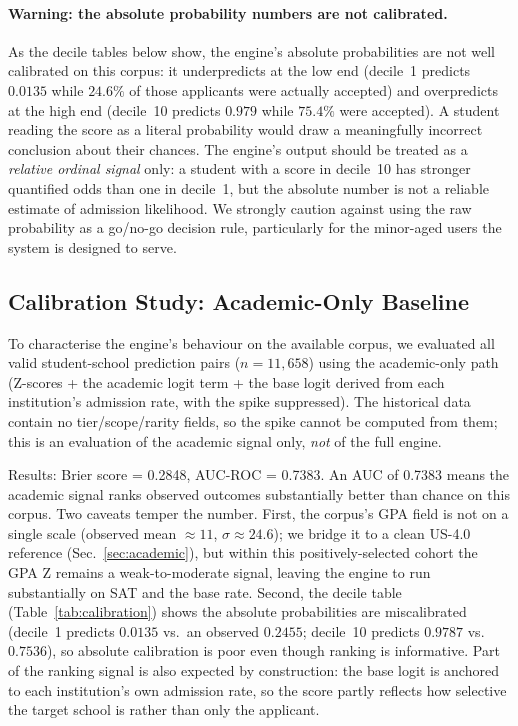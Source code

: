 \documentclass[conference]{IEEEtran}
\begin{document}
\paragraph{Warning: the absolute probability numbers are not calibrated.}
As the decile tables below show, the engine's absolute probabilities are not well calibrated on this corpus: it underpredicts at the low end (decile~1 predicts $0.0135$ while $24.6\%$ of those applicants were actually accepted) and overpredicts at the high end (decile~10 predicts $0.979$ while $75.4\%$ were accepted). A student reading the score as a literal probability would draw a meaningfully incorrect conclusion about their chances. The engine's output should be treated as a \textit{relative ordinal signal} only: a student with a score in decile~10 has stronger quantified odds than one in decile~1, but the absolute number is not a reliable estimate of admission likelihood. We strongly caution against using the raw probability as a go/no-go decision rule, particularly for the minor-aged users the system is designed to serve.

\subsection{Calibration Study: Academic-Only Baseline}
To characterise the engine's behaviour on the available corpus, we evaluated all valid student-school prediction pairs ($n = 11{,}658$) using the academic-only path (Z-scores + the academic logit term + the base logit derived from each institution's admission rate, with the spike suppressed). The historical data contain no tier/scope/rarity fields, so the spike cannot be computed from them; this is an evaluation of the academic signal only, \textit{not} of the full engine.

Results: Brier score = 0.2848, AUC-ROC = 0.7383. An AUC of 0.7383 means the academic signal ranks observed outcomes substantially better than chance on this corpus. Two caveats temper the number. First, the corpus's GPA field is not on a single scale (observed mean $\approx 11$, $\sigma \approx 24.6$); we bridge it to a clean US-4.0 reference (Sec.~\ref{sec:academic}), but within this positively-selected cohort the GPA Z remains a weak-to-moderate signal, leaving the engine to run substantially on SAT and the base rate. Second, the decile table (Table~\ref{tab:calibration}) shows the absolute probabilities are miscalibrated (decile~1 predicts $0.0135$ vs.\ an observed $0.2455$; decile~10 predicts $0.9787$ vs.\ $0.7536$), so absolute calibration is poor even though ranking is informative. Part of the ranking signal is also expected by construction: the base logit is anchored to each institution's own admission rate, so the score partly reflects how selective the target school is rather than only the applicant.
\end{document}
